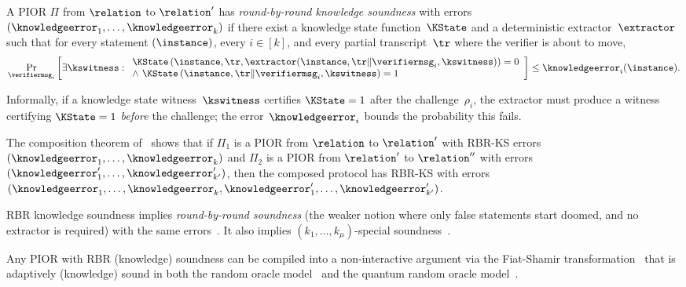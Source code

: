 \begin{definition}
\label{def:rbr-ks}
A PIOR $\Pi$ from $\relation$ to $\relation'$ has \emph{round-by-round knowledge soundness} with errors $(\knowledgeerror_1, \ldots, \knowledgeerror_k)$ if there exist a knowledge state function~$\KState$ and a deterministic extractor~$\extractor$ such that for every statement $(\index, \instance)$, every $i \in [k]$, and every partial transcript~$\tr$ where the verifier is about to move,
\[
  \Pr_{\verifiermsg_i}\left[
    \exists \kswitness :
    \begin{array}{ll}
        \KState\left(\index, \instance, \tr, \extractor(\index,\instance,\tr\|\verifiermsg_i,\kswitness)\right) = 0 \\
        \land \ 
        \KState\left(\index, \instance, \tr \| \verifiermsg_i, \kswitness\right) = 1
    \end{array}
  \right]
  \leq \knowledgeerror_i(\index,\instance).
\]
\end{definition}

Informally, if a knowledge state witness~$\kswitness$ certifies $\KState = 1$ after the challenge~$\rho_i$, the extractor must produce a witness certifying $\KState = 1$ \emph{before} the challenge; the error~$\knowledgeerror_i$ bounds the probability this fails.

\begin{remark}
The composition theorem of~\cite{BCFW25} shows that if $\Pi_1$ is a PIOR from $\relation$ to $\relation'$ with RBR-KS errors $(\knowledgeerror_1, \ldots, \knowledgeerror_k)$ and $\Pi_2$ is a PIOR from $\relation'$ to $\relation''$ with errors $(\knowledgeerror'_1, \ldots, \knowledgeerror'_{k'})$, then the composed protocol has RBR-KS with errors $(\knowledgeerror_1, \ldots, \knowledgeerror_k, \knowledgeerror'_1, \ldots, \knowledgeerror'_{k'})$.
\end{remark}

\begin{remark}
RBR knowledge soundness implies \emph{round-by-round soundness} (the weaker notion where only false statements start doomed, and no extractor is required) with the same errors~\cite[Remark~4.4]{JC:BGTZ25}. It also implies $(k_1, \ldots, k_\mu)$-special soundness~\cite[Theorem~1.2]{JC:BGTZ25}.
\end{remark}

\begin{remark}
Any PIOR with RBR (knowledge) soundness can be compiled into a non-interactive argument via the Fiat-Shamir transformation~\cite{TCC:BenChiSpo16} that is adaptively (knowledge) sound in both the random oracle model~\cite{TCC:BenChiSpo16} and the quantum random oracle model~\cite{TCC:ChiManSpo19}.
\end{remark}

